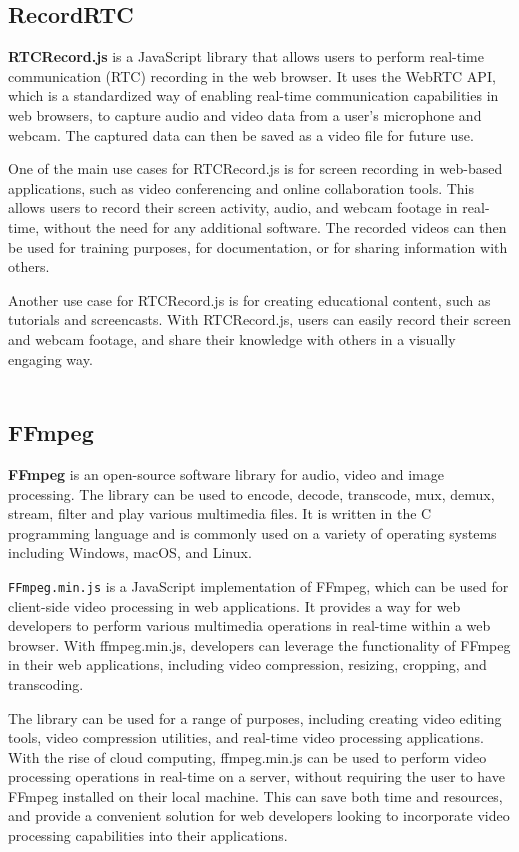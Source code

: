 \subsection{RecordRTC}
\textbf{RTCRecord.js} is a JavaScript library that allows users to perform real-time communication (RTC) 
recording in the web browser. It uses the WebRTC API, which is a standardized way of enabling 
real-time communication capabilities in web browsers, to capture audio and video data from a 
user's microphone and webcam. The captured data can then be saved as a video file for future use.

One of the main use cases for RTCRecord.js is for screen recording in web-based applications, 
such as video conferencing and online collaboration tools. This allows users to record their 
screen activity, audio, and webcam footage in real-time, without the need for any additional 
software. The recorded videos can then be used for training purposes, for documentation, 
or for sharing information with others.

Another use case for RTCRecord.js is for creating educational content, such as tutorials 
and screencasts. With RTCRecord.js, users can easily record their screen and webcam footage, 
and share their knowledge with others in a visually engaging way. \cite{rtcrecord}
\\
\\
\subsection{FFmpeg}
\textbf{FFmpeg} is an open-source software library for audio, video and image processing. 
The library can be used to encode, decode, transcode, mux, demux, stream, filter and play various 
multimedia files. It is written in the C programming language and is commonly used on a variety of 
operating systems including Windows, macOS, and Linux.

\texttt{FFmpeg.min.js} is a JavaScript implementation of FFmpeg, which can be used for client-side video 
processing in web applications. It provides a way for web developers to perform various multimedia 
operations in real-time within a web browser. With ffmpeg.min.js, developers can leverage the 
functionality of FFmpeg in their web applications, including video compression, resizing, cropping, and transcoding.

The library can be used for a range of purposes, including creating video editing tools, video 
compression utilities, and real-time video processing applications. With the rise of cloud computing, 
ffmpeg.min.js can be used to perform video processing operations in real-time on a server, without requiring 
the user to have FFmpeg installed on their local machine. This can save both time and resources, and provide 
a convenient solution for web developers looking to incorporate video processing capabilities into their applications. \cite{ffmpeg}
\\
\\
